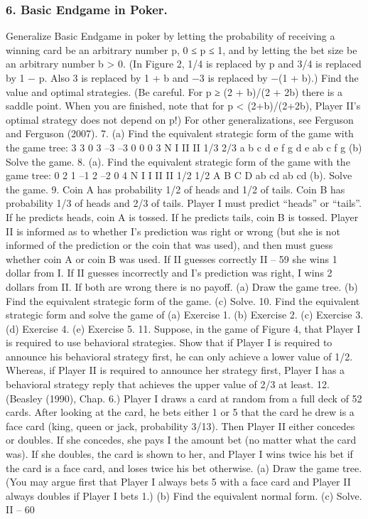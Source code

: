 \subsubsection{6. Basic Endgame in Poker.} Generalize Basic Endgame in poker by letting the
probability of receiving a winning card be an arbitrary number p, 0 ≤ p ≤ 1, and by letting
the bet size be an arbitrary number b > 0. (In Figure 2, 1/4 is replaced by p and 3/4 is
replaced by 1 − p. Also 3 is replaced by 1 + b and −3 is replaced by −(1 + b).) Find the
value and optimal strategies. (Be careful. For p ≥ (2 + b)/(2 + 2b) there is a saddle point.
When you are finished, note that for p < (2+b)/(2+2b), Player II’s optimal strategy does
not depend on p!) For other generalizations, see Ferguson and Ferguson (2007).
7. (a) Find the equivalent strategic form of the game with the game tree:
3
3 0 3 –3 –3 0 0 0 3
N
I II
II
1/3 2/3
a b c d e
f g d e ab c f g
(b) Solve the game.
8. (a). Find the equivalent strategic form of the game with the game tree:
0 2 1 –1 2 –2 0 4
N
I I
II II
1/2 1/2
A B C D
ab cd ab cd
(b). Solve the game.
9. Coin A has probability 1/2 of heads and 1/2 of tails. Coin B has probability 1/3 of
heads and 2/3 of tails. Player I must predict “heads” or “tails”. If he predicts heads, coin
A is tossed. If he predicts tails, coin B is tossed. Player II is informed as to whether I’s
prediction was right or wrong (but she is not informed of the prediction or the coin that
was used), and then must guess whether coin A or coin B was used. If II guesses correctly
II – 59
she wins 1 dollar from I. If II guesses incorrectly and I’s prediction was right, I wins 2
dollars from II. If both are wrong there is no payoff.
(a) Draw the game tree.
(b) Find the equivalent strategic form of the game.
(c) Solve.
10. Find the equivalent strategic form and solve the game of
(a) Exercise 1.
(b) Exercise 2.
(c) Exercise 3.
(d) Exercise 4.
(e) Exercise 5.
11. Suppose, in the game of Figure 4, that Player I is required to use behavioral
strategies. Show that if Player I is required to announce his behavioral strategy first, he
can only achieve a lower value of 1/2. Whereas, if Player II is required to announce her
strategy first, Player I has a behavioral strategy reply that achieves the upper value of 2/3
at least.
12. (Beasley (1990), Chap. 6.) Player I draws a card at random from a full deck of
52 cards. After looking at the card, he bets either 1 or 5 that the card he drew is a face
card (king, queen or jack, probability 3/13). Then Player II either concedes or doubles. If
she concedes, she pays I the amount bet (no matter what the card was). If she doubles,
the card is shown to her, and Player I wins twice his bet if the card is a face card, and
loses twice his bet otherwise.
(a) Draw the game tree. (You may argue first that Player I always bets 5 with a face card
and Player II always doubles if Player I bets 1.)
(b) Find the equivalent normal form.
(c) Solve.
II – 60

